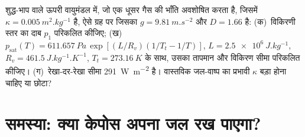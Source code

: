 \begin{exercise}[$\star\star\star$]\label{exo:b3:planetary-atmospheres:12}
शुद्ध-भाप वाले ऊपरी वायुमंडल में, जो एक धूसर गैस की भाँति अवशोषित करता है, जिसमें $\kappa =
\qty{0.005}{m^2.kg^{-1}}$ है, ऐसे ग्रह पर जिसका $g = \qty{9.81}{m.s^{-2}}$
और $D = 1.66$ है: (क)~विकिरणी स्तर का दाब $p_1$ परिकलित कीजिए;
(ख)~$p_\mathrm{sat}(T) = \qty{611.657}{Pa}\,\exp[(L/R_v)(1/T_t -
1/T)]$, $L = \qty{2.5e6}{J.kg^{-1}}$, $R_v = \qty{461.5}{J.kg^{-1}.K^{-1}}$,
$T_t = \qty{273.16}{K}$ के साथ, उसका तापमान और विकिरण सीमा परिकलित कीजिए।
(ग)~रेखा-दर-रेखा सीमा \qty{291}{W.m^{-2}} है। वास्तविक जल-वाष्प का प्रभावी
$\kappa$ बड़ा होना चाहिए या छोटा?
\end{exercise}

\section{समस्या: क्या केपोस अपना जल रख पाएगा?}

